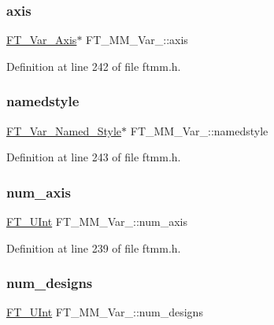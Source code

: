\subsubsection{\texorpdfstring{axis}{axis}}
{\footnotesize\ttfamily \mbox{\hyperlink{ftmm_8h_a8b0e5ef119b710a0a4e09c759effe038}{F\+T\+\_\+\+Var\+\_\+\+Axis}}$\ast$ F\+T\+\_\+\+M\+M\+\_\+\+Var\+\_\+\+::axis}



Definition at line 242 of file ftmm.\+h.

\mbox{\label{struct_f_t___m_m___var___acda1ec5211250ddc06ec090f695adabf}} 
\subsubsection{\texorpdfstring{namedstyle}{namedstyle}}
{\footnotesize\ttfamily \mbox{\hyperlink{ftmm_8h_a0e14db2af2621f16b9446ce0dd7734a1}{F\+T\+\_\+\+Var\+\_\+\+Named\+\_\+\+Style}}$\ast$ F\+T\+\_\+\+M\+M\+\_\+\+Var\+\_\+\+::namedstyle}



Definition at line 243 of file ftmm.\+h.

\mbox{\label{struct_f_t___m_m___var___acd32d4eb128f6fd9f6fde7da4c7b99bf}} 
\subsubsection{\texorpdfstring{num\_axis}{num\_axis}}
{\footnotesize\ttfamily \mbox{\hyperlink{fttypes_8h_abcb8db4dbf35d2b55a9e8c7b0926dc52}{F\+T\+\_\+\+U\+Int}} F\+T\+\_\+\+M\+M\+\_\+\+Var\+\_\+\+::num\+\_\+axis}



Definition at line 239 of file ftmm.\+h.

\mbox{\label{struct_f_t___m_m___var___a5109a6a20626d90ed44cd64363d29e92}} 
\subsubsection{\texorpdfstring{num\_designs}{num\_designs}}
{\footnotesize\ttfamily \mbox{\hyperlink{fttypes_8h_abcb8db4dbf35d2b55a9e8c7b0926dc52}{F\+T\+\_\+\+U\+Int}} F\+T\+\_\+\+M\+M\+\_\+\+Var\+\_\+\+::num\+\_\+designs}



